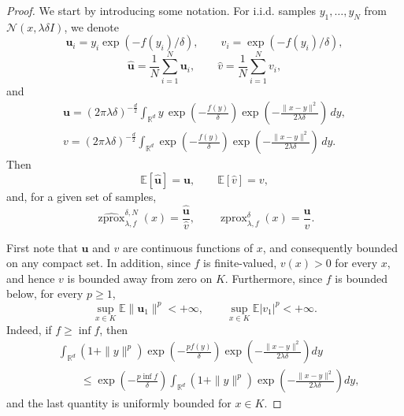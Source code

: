 \documentclass{article}
\newcommand{\zprox}{\ensuremath{\operatorname{zprox}}}
\newcommand{\szprox}{\ensuremath{\widehat{\operatorname{zprox}}}}
\begin{document}
\begin{proof}
We start by introducing some notation. For i.i.d. samples
\(y_1,\ldots,y_N\) from \(\mathcal{N}(x,\lambda \delta I)\), we denote
\[
    \mathbf u_i
    =
    y_i\exp(-f(y_i)/\delta),
    \qquad
    v_i
    =
    \exp(-f(y_i)/\delta),
\]
\[
    \hat{\mathbf u}
    =
    \frac{1}{N}\sum_{i=1}^N\mathbf u_i,
    \qquad
    \hat v
    =
    \frac{1}{N}\sum_{i=1}^Nv_i,
\]
and
\[
\begin{gathered}
\mathbf u
=
(2\pi\lambda\delta)^{-\frac{d}{2}}
\int_{\mathbb{R}^d}
y\,
\exp\!\left(-\frac{f(y)}{\delta}\right)
\exp\!\left(-\frac{\|x-y\|^2}{2\lambda\delta}\right)\,dy,
\\
v
=
(2\pi\lambda\delta)^{-\frac{d}{2}}
\int_{\mathbb{R}^d}
\exp\!\left(-\frac{f(y)}{\delta}\right)
\exp\!\left(-\frac{\|x-y\|^2}{2\lambda\delta}\right)\,dy.
\end{gathered}
\]
Then
\[
    \mathbb{E}[\hat{\mathbf u}]=\mathbf u,
    \qquad
    \mathbb{E}[\hat v]=v,
\]
and, for a given set of samples,
\[
    \szprox^{\delta,N}_{\lambda, f}(x)
    =
    \frac{\hat{\mathbf u}}{\hat v},
    \qquad
    \zprox^{\delta}_{\lambda, f}(x)
    =
    \frac{\mathbf u}{v}.
\]

First note that \(\mathbf u\) and \(v\) are continuous functions of \(x\), and consequently bounded on any compact set. In addition, since \(f\) is finite-valued, \(v(x)>0\) for every \(x\), and hence \(v\) is bounded away from zero on \(K\). Furthermore, since \(f\) is bounded below, for every \(p\ge 1\),
\[
\sup_{x\in K}\mathbb{E}\|\mathbf u_1\|^p<+\infty,
\qquad
\sup_{x\in K}\mathbb{E}|v_1|^p<+\infty .
\]
Indeed, if \(f\ge \inf f\), then
\[
\begin{aligned}
&\int_{\mathbb{R}^d}(1+\|y\|^p)
\exp\left(-\frac{p f(y)}{\delta}\right)
\exp\!\left(-\frac{\|x-y\|^2}{2\lambda\delta}\right)dy \\
&\qquad\le
\exp\left(-\frac{p\inf f}{\delta}\right)
\int_{\mathbb{R}^d}(1+\|y\|^p)
\exp\!\left(-\frac{\|x-y\|^2}{2\lambda\delta}\right)dy,
\end{aligned}
\]
and the last quantity is uniformly bounded for \(x\in K\).


\end{proof}
\end{document}
